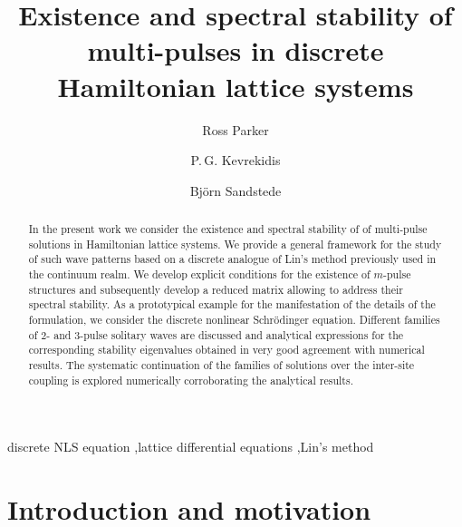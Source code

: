 \documentclass[12pt]{elsarticle}
\begin{document}
\begin{frontmatter}

\title{Existence and spectral stability of multi-pulses in discrete Hamiltonian lattice systems}

\author[1]{Ross Parker}
\author[2,3]{P.\,G. Kevrekidis} 
\author[1]{Bj\"{o}rn Sandstede}

\address[1]{Division of Applied Mathematics, Brown University, Providence, RI 02912, USA}
\address[2]{Department of Mathematics and Statistics, University of Massachusetts, Amherst MA 01003, USA}
\address[3]{Mathematical Institute, University of Oxford, Oxford, OX2 6GG, UK}

\begin{abstract}
    In the present work we consider the existence and spectral stability of  
    of multi-pulse solutions in Hamiltonian lattice systems.
    We provide a general framework for the study
    of such wave patterns based on a discrete
    analogue of Lin's method previously used in
    the continuum realm. We develop explicit conditions
    for the existence of $m$-pulse structures and
    subsequently develop a reduced matrix allowing to
    address their spectral stability. As a prototypical
    example for the manifestation of the details of
    the formulation, we consider the discrete nonlinear
    Schr{\"o}dinger equation. Different families
    of $2$- and $3$-pulse solitary waves are discussed
    and analytical expressions for the corresponding 
    stability eigenvalues obtained in very good agreement
    with numerical results. The systematic continuation of
    the families of solutions over the inter-site coupling is explored numerically 
    corroborating the analytical results.
\end{abstract}

\begin{keyword}
discrete NLS equation \sep lattice differential equations \sep Lin's method
\end{keyword}

\end{frontmatter}

\section{Introduction and motivation}
\end{document}
